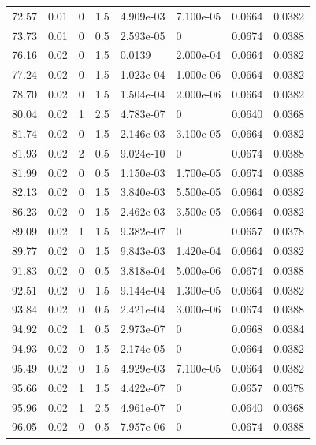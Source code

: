 \documentclass[preview]{standalone}
\begin{document}
{{{\begin{tabular}{L{1.2cm}C{1.2cm} C{0.3cm}C{0.5cm} C{1.4cm}C{1.4cm} C{1.4cm}C{1.4cm}}
  72.57  &  0.01  & 0     & 1.5 &  4.909e-03  & 7.100e-05  & 0.0664 &  0.0382   \\ 
  73.73  &  0.01  & 0     & 0.5 &  2.593e-05  & 0  & 0.0674 &  0.0388   \\ 
  76.16  &  0.02  & 0     & 1.5 &  0.0139  & 2.000e-04  & 0.0664 &  0.0382   \\ 
  77.24  &  0.02  & 0     & 1.5 &  1.023e-04  & 1.000e-06  & 0.0664 &  0.0382   \\ 
  78.70  &  0.02  & 0     & 1.5 &  1.504e-04  & 2.000e-06  & 0.0664 &  0.0382   \\ 
  80.04  &  0.02  & 1     & 2.5 &  4.783e-07  & 0  & 0.0640 &  0.0368   \\ 
  81.74  &  0.02  & 0     & 1.5 &  2.146e-03  & 3.100e-05  & 0.0664 &  0.0382   \\ 
  81.93  &  0.02  & 2     & 0.5 &  9.024e-10  & 0  & 0.0674 &  0.0388   \\ 
  81.99  &  0.02  & 0     & 0.5 &  1.150e-03  & 1.700e-05  & 0.0674 &  0.0388   \\ 
  82.13  &  0.02  & 0     & 1.5 &  3.840e-03  & 5.500e-05  & 0.0664 &  0.0382   \\ 
  86.23  &  0.02  & 0     & 1.5 &  2.462e-03  & 3.500e-05  & 0.0664 &  0.0382   \\ 
  89.09  &  0.02  & 1     & 1.5 &  9.382e-07  & 0  & 0.0657 &  0.0378   \\ 
  89.77  &  0.02  & 0     & 1.5 &  9.843e-03  & 1.420e-04  & 0.0664 &  0.0382   \\ 
  91.83  &  0.02  & 0     & 0.5 &  3.818e-04  & 5.000e-06  & 0.0674 &  0.0388   \\ 
  92.51  &  0.02  & 0     & 1.5 &  9.144e-04  & 1.300e-05  & 0.0664 &  0.0382   \\ 
  93.84  &  0.02  & 0     & 0.5 &  2.421e-04  & 3.000e-06  & 0.0674 &  0.0388   \\ 
  94.92  &  0.02  & 1     & 0.5 &  2.973e-07  & 0  & 0.0668 &  0.0384   \\ 
  94.93  &  0.02  & 0     & 1.5 &  2.174e-05  & 0  & 0.0664 &  0.0382   \\ 
  95.49  &  0.02  & 0     & 1.5 &  4.929e-03  & 7.100e-05  & 0.0664 &  0.0382   \\ 
  95.66  &  0.02  & 1     & 1.5 &  4.422e-07  & 0  & 0.0657 &  0.0378   \\ 
  95.96  &  0.02  & 1     & 2.5 &  4.961e-07  & 0  & 0.0640 &  0.0368   \\ 
  96.05  &  0.02  & 0     & 0.5 &  7.957e-06  & 0  & 0.0674 &  0.0388   \\ 

\end{tabular}}}}
\end{document}
